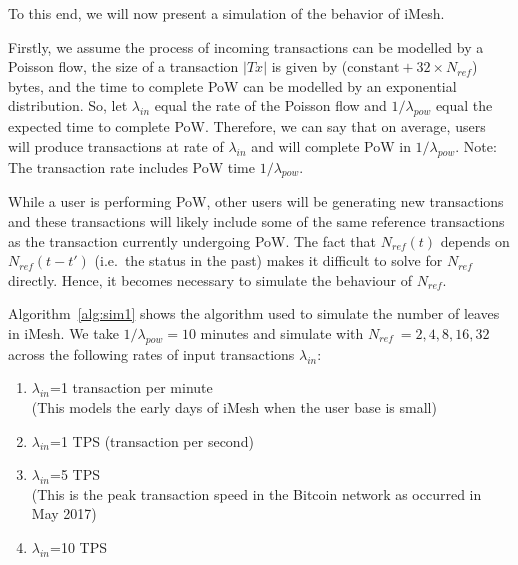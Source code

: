 \documentclass[a4paper,10pt,twocolumn]{article}
\begin{document}
To this end, we will now present a simulation of the behavior of iMesh.

Firstly, we assume the process of incoming transactions can be modelled by a Poisson flow, the size of a  transaction  \(|Tx|\)  is given by (\( \text{constant} + 32 \times N_{ref}\)) bytes, and the time to complete PoW can be modelled by an exponential distribution.
So, let \(\lambda_{in}\) equal the rate of the Poisson flow  and \(1 / \lambda_{pow}\) equal the expected time to complete PoW.
Therefore, we can say that on average, users will produce transactions at rate of \(\lambda_{in}\) and will complete PoW in \(1/\lambda_{pow}\).
Note: The transaction rate includes PoW time \(1/\lambda_{pow}\).

While a user is performing PoW, other users will be generating new transactions and these transactions will likely include some of the same reference transactions as the transaction currently undergoing PoW.
The fact that \( N_{ref} (t) \) depends on \( N_{ref} (t-t')\) (i.e.\ the status in the past) makes it difficult 
to solve for \( N_{ref}\) directly. Hence, it becomes necessary to simulate the behaviour of \( N_{ref}\).

Algorithm~\ref{alg:sim1} shows the algorithm used to simulate the number of leaves in iMesh.
We take \(1 / \lambda_{pow} = 10 \) minutes and simulate with \(N_{ref}\ = 2, 4, 8, 16, 32 \) across the following rates of input transactions \(\lambda_{in} \):

\vspace{-0.5\baselineskip}
\begin{enumerate}
	\setlength\itemsep{0em}
\item \(\lambda_{in} \)=1 transaction per minute \\
 (This models the early days of iMesh when the user base is small)
\item \(\lambda_{in} \)=1 TPS (transaction per second)
\item \(\lambda_{in} \)=5 TPS \\
 (This is the peak transaction speed in the Bitcoin network as occurred in May 2017)
 \item \(\lambda_{in} \)=10 TPS
\end{enumerate}
\end{document}
